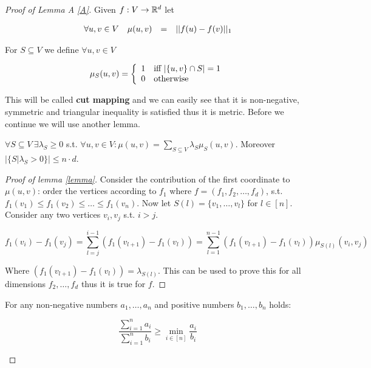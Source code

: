 \begin{proof}[Proof of Lemma A \ref{A}]
	Given $f: V \to \mathbb{R}^{d}$ let
	
	$$
	\begin{array}{l r c l}
		\forall u,v \in V & \mu (u,v) & = & ||f(u) - f(v)||_{1}
	\end{array}
	$$
	
	For $S \subseteq V$ we define $\forall u,v \in V$
	
	$$
	\mu_{S}(u,v) =
	\left\{
	\begin{array}{l l}
		1 & \text{iff } |\{u,v\} \cap S| = 1 \\
		0 & \text{otherwise}
	\end{array}
	\right.
	$$
	
	This will be called \textbf{cut mapping} and we can easily see that it is non-negative, symmetric and triangular inequality is satisfied thus it is metric. Before we continue we will use another lemma.
	
	\begin{lemma}[lemma]\label{lemma}
		$\forall S \subseteq V \ \exists \lambda_{S} \geq 0$ s.t. $\forall u,v \in V: \mu(u,v) = \sum_{S \subseteq V} \lambda_{S} \mu_{S}(u,v)$. Moreover $|\{S | \lambda_{S} > 0\}| \leq n \cdot d$.
	\end{lemma}
	
	\begin{proof}[Proof of lemma \ref{lemma}]
		Consider the contribution of the first coordinate to $\mu(u,v)$: order the vertices according to $f_{1}$ where $f = (f_{1}, f_{2}, \dots, f_{d})$, s.t. $f_{1}(v_{1}) \leq f_{1}(v_{2}) \leq \dots \leq f_{1}(v_{n})$. Now let $S(l) = \{v_{1}, \dots, v_{l}\}$ for $l \in [n]$. Consider any two vertices $v_{i},v_{j}$ s.t. $i > j$.
		
		$$
		f_{1}(v_{i}) - f_{1}(v_{j}) = \sum_{l=j}^{i-1} (f_{1}(v_{l+1}) - f_{1}(v_{l})) = \sum_{l = 1}^{n-1} (f_{1}(v_{l+1}) - f_{1}(v_{l})) \mu_{S(l)} (v_{i}, v_{j}) 
		$$
		
		Where $(f_{1}(v_{l+1}) - f_{1}(v_{l})) = \lambda_{S(l)}$. This can be used to prove this for all dimensions $f_{2}, \dots, f_{d}$ thus it is true for $f$.
	\end{proof}
	
	\begin{observ}
		For any non-negative numbers $a_{1}, \dots, a_{n}$ and positive numbers $b_{1}, \dots, b_{n}$ holds:
		
		$$
		\frac{\sum_{i = 1}^{n} a_{i}}{\sum_{i = 1}^{n} b_{i}} \geq \min_{i \in [n]} \frac{a_{i}}{b_{i}}
		$$
	\end{observ}
	

\end{proof}
